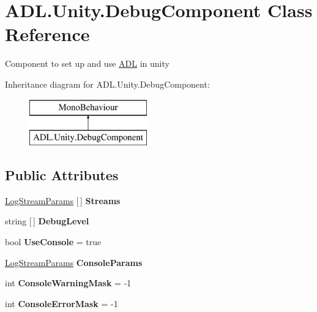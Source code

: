 \hypertarget{class_a_d_l_1_1_unity_1_1_debug_component}{}\section{A\+D\+L.\+Unity.\+Debug\+Component Class Reference}
\label{class_a_d_l_1_1_unity_1_1_debug_component}


Component to set up and use \mbox{\hyperlink{namespace_a_d_l}{A\+DL}} in unity  


Inheritance diagram for A\+D\+L.\+Unity.\+Debug\+Component\+:\begin{figure}[H]
\begin{center}
\leavevmode
\includegraphics[height=2.000000cm]{class_a_d_l_1_1_unity_1_1_debug_component}
\end{center}
\end{figure}
\subsection*{Public Attributes}
\begin{DoxyCompactItemize}
\item 
\mbox{\label{class_a_d_l_1_1_unity_1_1_debug_component_a2aa57f89e78ecf57df57b7a0819b8a03}} 
\mbox{\hyperlink{class_a_d_l_1_1_unity_1_1_log_stream_params}{Log\+Stream\+Params}} \mbox{[}$\,$\mbox{]} {\bfseries Streams}
\item 
\mbox{\label{class_a_d_l_1_1_unity_1_1_debug_component_a291ba4f39b3eeb64032fffaf0273bcd4}} 
string \mbox{[}$\,$\mbox{]} {\bfseries Debug\+Level}
\item 
\mbox{\label{class_a_d_l_1_1_unity_1_1_debug_component_a265f04906b1dea90b4fd596c54487cd6}} 
bool {\bfseries Use\+Console} = true
\item 
\mbox{\label{class_a_d_l_1_1_unity_1_1_debug_component_ab71e17ba3b7484cdff81a134138f6a3a}} 
\mbox{\hyperlink{class_a_d_l_1_1_unity_1_1_log_stream_params}{Log\+Stream\+Params}} {\bfseries Console\+Params}
\item 
\mbox{\label{class_a_d_l_1_1_unity_1_1_debug_component_a54d243584c6cf8386fcdd889087ffd84}} 
int {\bfseries Console\+Warning\+Mask} = -\/1
\item 
\mbox{\label{class_a_d_l_1_1_unity_1_1_debug_component_a32a3c2d7d092ce8fa1834a0f29efd2b5}} 
int {\bfseries Console\+Error\+Mask} = -\/1
\end{DoxyCompactItemize}
